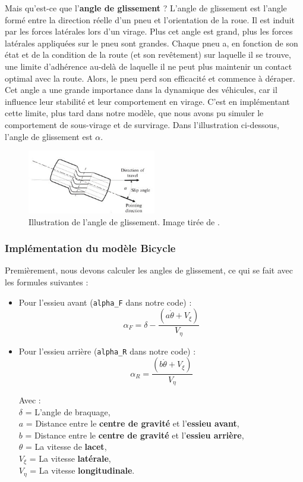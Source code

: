 Mais qu'est-ce que l'\textbf{angle de glissement} ? L'angle de glissement est l'angle formé entre la direction réelle d'un pneu et l'orientation de la roue. Il est induit par les forces latérales lors d'un virage. Plus cet angle est grand, plus les forces latérales appliquées sur le pneu sont grandes. Chaque pneu a, en fonction de son état et de la condition de la route (et son revêtement) sur laquelle il se trouve, une limite d'adhérence au-delà de laquelle il ne peut plus maintenir un contact optimal avec la route. Alors, le pneu perd son efficacité et commence à déraper. Cet angle a une grande importance dans la dynamique des véhicules, car il influence leur stabilité et
leur comportement en virage.
C'est en implémentant cette limite, plus tard dans notre modèle, que nous avons pu simuler le comportement de sous-virage et de survirage.
Dans l'illustration ci-dessous, l'angle de glissement est $\alpha$.
\begin{figure}[h]
    \centering
    \includegraphics[width=0.5\textwidth]{resources/Plots/Etape2/slip-angle}
    \caption{Illustration de l'angle de glissement. Image tirée de \cite{slip-angle}.}
    \label{fig:bicycle_model}
\end{figure}

\subsubsection{Implémentation du modèle Bicycle}
Premièrement, nous devons calculer les angles de glissement, ce qui se fait avec les formules suivantes :

\begin{itemize}
    \item Pour l'essieu avant (\texttt{alpha\_F} dans notre code) :
    $$\alpha_F = \delta - \frac{(a \dot{\theta}+V_{\xi})}{V_\eta}$$
    \item Pour l'essieu arrière (\texttt{alpha\_R} dans notre code) :
    $$\alpha_R = \frac{(b \dot{\theta}+V_{\xi})}{V_\eta} $$

    Avec :\\
    $\delta$ = L'angle de braquage, \\
    $a$ = Distance entre le \textbf{centre de gravité} et l'\textbf{essieu avant},\\
    $b$ = Distance entre le \textbf{centre de gravité} et l'\textbf{essieu arrière},\\
    $\theta$ = La vitesse de \textbf{lacet}, \\
    $V_\xi$ = La vitesse \textbf{latérale}, \\
    $V_\eta$ = La vitesse \textbf{longitudinale}. \\
\end{itemize}

